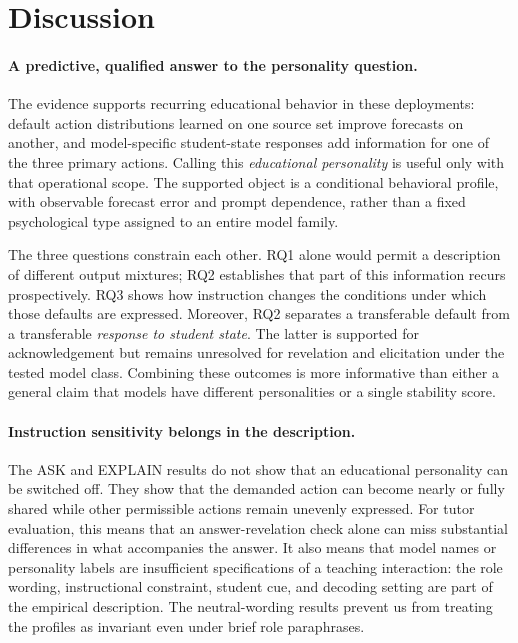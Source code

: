 \section{Discussion}
\label{sec:discussion}

\paragraph{A predictive, qualified answer to the personality question.}
The evidence supports recurring educational behavior in these deployments:
default action distributions learned on one source set improve forecasts on
another, and model-specific student-state responses add information for one
of the three primary actions. Calling this \emph{educational personality} is
useful only with that operational scope. The supported object is a conditional
behavioral profile, with observable forecast error and prompt dependence,
rather than a fixed psychological type assigned to an entire model family.

The three questions constrain each other. RQ1 alone would permit a description
of different output mixtures; RQ2 establishes that part of this information
recurs prospectively. RQ3 shows how instruction changes the conditions under
which those defaults are expressed. Moreover, RQ2 separates a transferable
default from a transferable \emph{response to student state}. The latter is
supported for acknowledgement but remains unresolved for revelation and
elicitation under the tested model class. Combining these outcomes is more
informative than either a general claim that models have different personalities
or a single stability score.

\paragraph{Instruction sensitivity belongs in the description.}
The ASK and EXPLAIN results do not show that an educational personality can
be switched off. They show that the demanded action can become nearly or fully
shared while other permissible actions remain unevenly expressed. For tutor
evaluation, this means that an answer-revelation check alone can miss substantial
differences in what accompanies the answer. It also means that model names or
personality labels are insufficient specifications of a teaching interaction:
the role wording, instructional constraint, student cue, and decoding setting
are part of the empirical description. The neutral-wording results prevent
us from treating the profiles as invariant even under brief role paraphrases.

